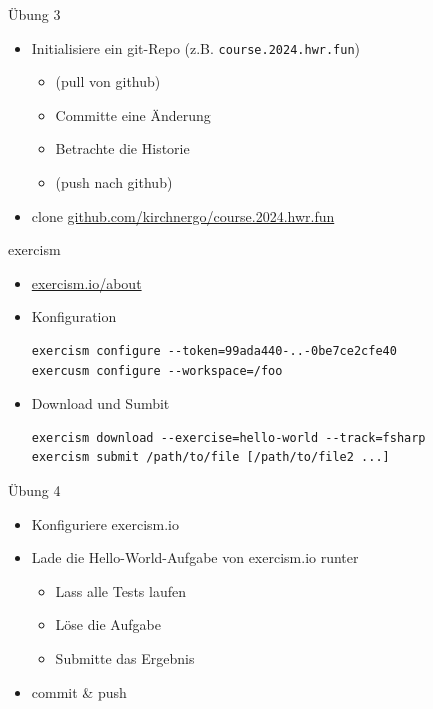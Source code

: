 \documentclass[t]{beamer}
\begin{document}
\begin{frame}[label={sec:orgfdc0ad6},fragile]{Übung 3}
 \begin{itemize}
\item Initialisiere ein git-Repo (z.B. \texttt{course.2024.hwr.fun})
\begin{itemize}
\item (pull von github)
\item Committe eine Änderung
\item Betrachte die Historie
\item (push nach github)
\end{itemize}
\item clone \href{https://github.com/kirchnergo/course.2024.hwr.fun}{github.com/kirchnergo/course.2024.hwr.fun}
\end{itemize}
\end{frame}

\begin{frame}[label={sec:orgb86bc36},fragile]{exercism}
 \begin{itemize}
\item \href{https://exercism.io/about}{exercism.io/about}
\item Konfiguration
\begin{verbatim}
exercism configure --token=99ada440-..-0be7ce2cfe40
exercusm configure --workspace=/foo
\end{verbatim}
\item Download und Sumbit
\begin{verbatim}
exercism download --exercise=hello-world --track=fsharp
exercism submit /path/to/file [/path/to/file2 ...]
\end{verbatim}
\end{itemize}
\end{frame}

\begin{frame}[label={sec:orgf36964b}]{Übung 4}
\begin{itemize}
\item Konfiguriere exercism.io
\item Lade die Hello-World-Aufgabe von exercism.io runter
\begin{itemize}
\item Lass alle Tests laufen
\item Löse die Aufgabe
\item Submitte das Ergebnis
\end{itemize}
\item commit \& push
\end{itemize}
\end{frame}
\end{document}
